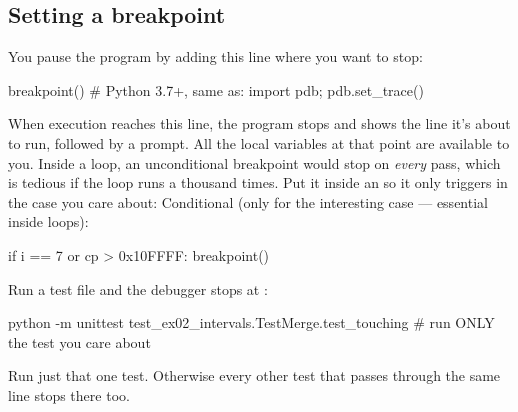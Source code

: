 \documentclass[10pt,a4paper]{article}
\begin{document}
\subsection{Setting a breakpoint}
You pause the program by adding this line where you want to stop:
\begin{pycode}
breakpoint()           # Python 3.7+, same as: import pdb; pdb.set_trace()
\end{pycode}
When execution reaches this line, the program stops and shows the line it’s about to run, followed by a  prompt. All the local variables at that point are available to you.
Inside a loop, an unconditional breakpoint would stop on \emph{every} pass, which is tedious if the loop runs a thousand times. Put it inside an  so it only triggers in the case you care about:
Conditional (only for the interesting case — essential inside loops):
\begin{pycode}
if i == 7 or cp > 0x10FFFF:
    breakpoint()
\end{pycode}
Run a test file and the debugger stops at :
\begin{shcode}
python -m unittest test_ex02_intervals.TestMerge.test_touching   # run ONLY the test you care about
\end{shcode}
Run just that one test. Otherwise every other test that passes through the same line stops there too.
\end{document}
